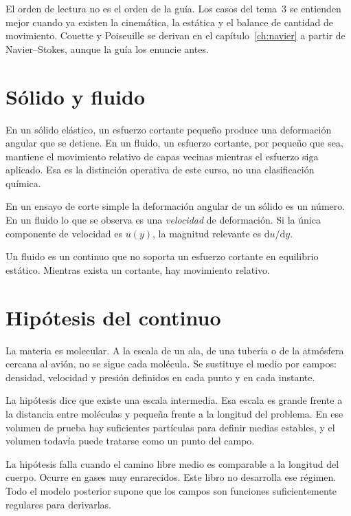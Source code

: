 El orden de lectura no es el orden de la guía. Los casos del tema~3 se entienden mejor cuando ya existen la cinemática, la estática y el balance de cantidad de movimiento. Couette y Poiseuille se derivan en el capítulo~\ref{ch:navier} a partir de Navier--Stokes, aunque la guía los enuncie antes.

\section{Sólido y fluido}

En un sólido elástico, un esfuerzo cortante pequeño produce una deformación angular que se detiene. En un fluido, un esfuerzo cortante, por pequeño que sea, mantiene el movimiento relativo de capas vecinas mientras el esfuerzo siga aplicado. Esa es la distinción operativa de este curso, no una clasificación química.

En un ensayo de corte simple la deformación angular de un sólido es un número. En un fluido lo que se observa es una \emph{velocidad} de deformación. Si la única componente de velocidad es \(u(y)\), la magnitud relevante es \(\mathrm{d}u/\mathrm{d}y\).

\begin{definitionbox}[Fluido]
Un fluido es un continuo que no soporta un esfuerzo cortante en equilibrio estático. Mientras exista un cortante, hay movimiento relativo.
\end{definitionbox}

\section{Hipótesis del continuo}

La materia es molecular. A la escala de un ala, de una tubería o de la atmósfera cercana al avión, no se sigue cada molécula. Se sustituye el medio por campos: densidad, velocidad y presión definidos en cada punto y en cada instante.

La hipótesis dice que existe una escala intermedia. Esa escala es grande frente a la distancia entre moléculas y pequeña frente a la longitud del problema. En ese volumen de prueba hay suficientes partículas para definir medias estables, y el volumen todavía puede tratarse como un punto del campo.

\begin{warningbox}
La hipótesis falla cuando el camino libre medio es comparable a la longitud del cuerpo. Ocurre en gases muy enrarecidos. Este libro no desarrolla ese régimen. Todo el modelo posterior supone que los campos son funciones suficientemente regulares para derivarlas.
\end{warningbox}

